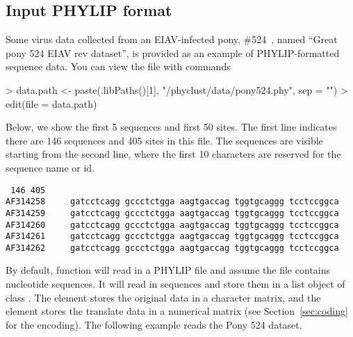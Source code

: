 \subsection[PHYLIP format]{Input PHYLIP format}
\label{sec:phylip}

Some virus data collected from an EIAV-infected pony, \#524~\citep{Baccam2003},
named ``Great pony 524 EIAV rev dataset'',
is provided as an example of PHYLIP-formatted sequence data.
You can view the file with commands
\begin{Code}
> data.path <- paste(.libPaths()[1], "/phyclust/data/pony524.phy", sep = "")
> edit(file = data.path)
\end{Code}
Below, we show the first 5 sequences and first 50 sites. The first line
indicates there are 146 sequences and 405 sites in this file. The sequences
are visible starting from the second line, where the first 10 characters are reserved for
the sequence name or id.
\begin{verbatim}
 146 405
AF314258     gatcctcagg gccctctgga aagtgaccag tggtgcaggg tcctccggca
AF314259     gatcctcagg gccctctgga aagtgaccag tggtgcaggg tcctccggca
AF314260     gatcctcagg gccctctgga aagtgaccag tggtgcaggg tcctccggca
AF314261     gatcctcagg gccctctgga aagtgaccag tggtgcaggg tcctccggca
AF314262     gatcctcagg gccctctgga aagtgaccag tggtgcaggg tcctccggca
\end{verbatim}

By default, function  will read in a PHYLIP file and
assume the file contains nucleotide sequences. It will read in sequences
and store them in a list object of class .  The element
 stores the original data in a character matrix, and
the element  stores the translate data in a numerical
matrix (see Section~\ref{sec:coding} for the encoding).
The following example reads the Pony 524 dataset.

